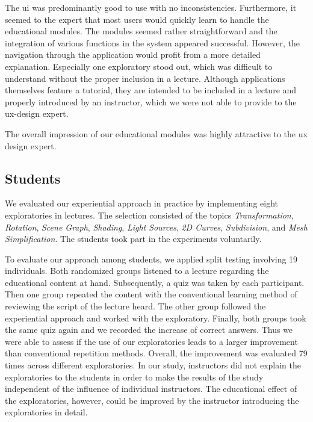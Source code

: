 The \acrshort{ui} was predominantly good to use with no inconsistencies. Furthermore, it seemed to the expert that most users would quickly learn to handle the educational modules. The modules seemed rather straightforward and the integration of various functions in the system appeared successful. However, the navigation through the application would profit from a more detailed explanation. Especially one exploratory stood out, which was difficult to understand without the proper inclusion in a lecture. Although applications themselves feature a tutorial, they are intended to be included in a lecture and properly introduced by an instructor, which we were not able to provide to the \acrshort{ux}-design expert. %

The overall impression of our educational modules was highly attractive to the \acrshort{ux} design expert.

\subsection{Students} %
We evaluated our experiential approach in practice by implementing eight exploratories in lectures. The selection consisted of the topics \textit{Transformation}, \textit{Rotation}, \textit{Scene Graph}, \textit{Shading}, \textit{Light Sources}, \textit{2D Curves}, \textit{Subdivision}, and \textit{Mesh Simplification}. The students took part in the experiments voluntarily.

To evaluate our approach among students, we applied split testing involving 19 individuals. Both randomized groups listened to a lecture regarding the educational content at hand. Subsequently, a quiz was taken by each participant. Then one group repeated the content with the conventional learning method of reviewing the script of the lecture heard. The other group followed the experiential approach and worked with the exploratory. Finally, both groups took the same quiz again and we recorded the increase of correct answers. Thus we were able to assess if the use of our exploratories leads to a larger improvement than conventional repetition methods. Overall, the improvement was evaluated 79 times across different exploratories. In our study, instructors did not explain the exploratories to the students in order to make the results of the study independent of the influence of individual instructors. The educational effect of the exploratories, however, could be improved by the instructor introducing the exploratories in detail.

